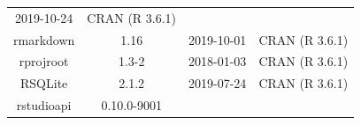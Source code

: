 \documentclass[11pt,]{book}
\begin{document}
\begin{longtable}[]{@{}cccc@{}}
\begin{minipage}[t]{0.16\columnwidth}
2019-10-24\strut
\end{minipage} & \begin{minipage}[t]{0.36\columnwidth}\centering\strut
CRAN (R 3.6.1)\strut
\end{minipage}\tabularnewline
\begin{minipage}[t]{0.18\columnwidth}\centering\strut
rmarkdown\strut
\end{minipage} & \begin{minipage}[t]{0.19\columnwidth}\centering\strut
1.16\strut
\end{minipage} & \begin{minipage}[t]{0.16\columnwidth}\centering\strut
2019-10-01\strut
\end{minipage} & \begin{minipage}[t]{0.36\columnwidth}\centering\strut
CRAN (R 3.6.1)\strut
\end{minipage}\tabularnewline
\begin{minipage}[t]{0.18\columnwidth}\centering\strut
rprojroot\strut
\end{minipage} & \begin{minipage}[t]{0.19\columnwidth}\centering\strut
1.3-2\strut
\end{minipage} & \begin{minipage}[t]{0.16\columnwidth}\centering\strut
2018-01-03\strut
\end{minipage} & \begin{minipage}[t]{0.36\columnwidth}\centering\strut
CRAN (R 3.6.1)\strut
\end{minipage}\tabularnewline
\begin{minipage}[t]{0.18\columnwidth}\centering\strut
RSQLite\strut
\end{minipage} & \begin{minipage}[t]{0.19\columnwidth}\centering\strut
2.1.2\strut
\end{minipage} & \begin{minipage}[t]{0.16\columnwidth}\centering\strut
2019-07-24\strut
\end{minipage} & \begin{minipage}[t]{0.36\columnwidth}\centering\strut
CRAN (R 3.6.1)\strut
\end{minipage}\tabularnewline
\begin{minipage}[t]{0.18\columnwidth}\centering\strut
rstudioapi\strut
\end{minipage} & \begin{minipage}[t]{0.19\columnwidth}\centering\strut
0.10.0-9001\strut
\end{minipage} & \begin{minipage}[t]{0.16\columnwidth}\centering\strut

\end{minipage}
\end{longtable}
\end{document}
